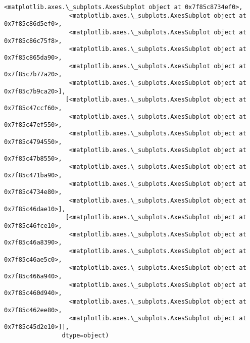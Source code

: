 \documentclass[11pt]{article}
\begin{document}
\begin{Verbatim}[commandchars=\\\{\}]
                  <matplotlib.axes.\_subplots.AxesSubplot object at 0x7f85c8734ef0>,
                  <matplotlib.axes.\_subplots.AxesSubplot object at 0x7f85c86d5ef0>,
                  <matplotlib.axes.\_subplots.AxesSubplot object at 0x7f85c86c75f8>,
                  <matplotlib.axes.\_subplots.AxesSubplot object at 0x7f85c865da90>,
                  <matplotlib.axes.\_subplots.AxesSubplot object at 0x7f85c7b77a20>,
                  <matplotlib.axes.\_subplots.AxesSubplot object at 0x7f85c7b9ca20>],
                 [<matplotlib.axes.\_subplots.AxesSubplot object at 0x7f85c47ccf60>,
                  <matplotlib.axes.\_subplots.AxesSubplot object at 0x7f85c47ef550>,
                  <matplotlib.axes.\_subplots.AxesSubplot object at 0x7f85c4794550>,
                  <matplotlib.axes.\_subplots.AxesSubplot object at 0x7f85c47b8550>,
                  <matplotlib.axes.\_subplots.AxesSubplot object at 0x7f85c471ba90>,
                  <matplotlib.axes.\_subplots.AxesSubplot object at 0x7f85c4734e80>,
                  <matplotlib.axes.\_subplots.AxesSubplot object at 0x7f85c46dae10>],
                 [<matplotlib.axes.\_subplots.AxesSubplot object at 0x7f85c46fce10>,
                  <matplotlib.axes.\_subplots.AxesSubplot object at 0x7f85c46a8390>,
                  <matplotlib.axes.\_subplots.AxesSubplot object at 0x7f85c46ae5c0>,
                  <matplotlib.axes.\_subplots.AxesSubplot object at 0x7f85c466a940>,
                  <matplotlib.axes.\_subplots.AxesSubplot object at 0x7f85c460d940>,
                  <matplotlib.axes.\_subplots.AxesSubplot object at 0x7f85c462ee80>,
                  <matplotlib.axes.\_subplots.AxesSubplot object at 0x7f85c45d2e10>]],
                dtype=object)
\end{Verbatim}
            
    \begin{center}
    \end{center}
    { \hspace*{\fill} \\}
    
\end{document}
